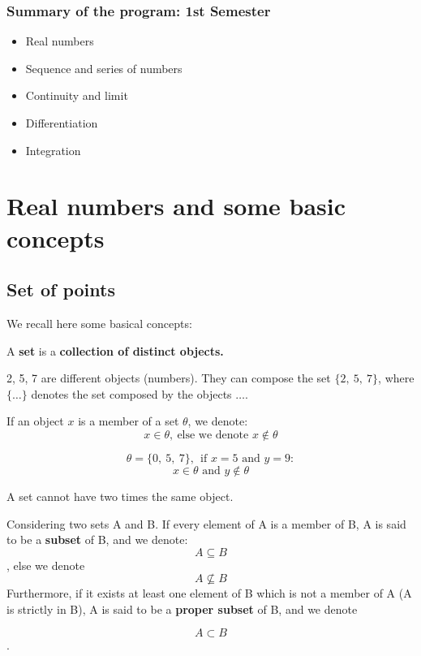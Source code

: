 \documentclass[12pt, a4paper]{book}
\begin{document}
\subsection*{Summary of the program: 1st Semester}
\begin{itemize}
  \item Real numbers
  \item Sequence and series of numbers
  \item Continuity and limit
  \item Differentiation
  \item Integration
\end{itemize}

\chapter{Real numbers and some basic concepts}

\section{Set of points}
We recall here some basical concepts:
\begin{defn}
  A \textbf{set} is a \textbf{collection of distinct objects.}
\end{defn}
\begin{exmp}
  2, 5, 7 are different objects (numbers). They can compose the set $\{2, \ 5, \ 7 \}$, where $\{ \ldots \}$ denotes the
  set composed by the objects $\ldots$.
\end{exmp}

\begin{note}
  If an object $x$ is a member of a set $\theta$, we denote: 
  $$ x \in \theta, \ \text{else we denote } x \notin \theta$$

  \begin{exmp}
    \[
      \theta = \{0, \ 5, \ 7 \}, \ \ \text{if }x=5 \text{ and } y=9:
    \]
    \[
      x \in \theta \text{ and } y \notin \theta
    \]
  \end{exmp}
\end{note}

\begin{rem}
  A set cannot have two times the same object.
\end{rem}

\begin{defn}
  Considering two sets A and B. If every element of A is a member of B, A is said to be a \textbf{subset} of B, and we denote:
  \boldmath $$ A \subseteq B$$, else we denote 
  $$ A \nsubseteq B $$ 
  Furthermore, if it exists at least one element of B which is not a member of A (A is strictly in B), A is said to be a \textbf{proper subset} of B, and we denote

  $$ A \subset B $$. \unboldmath
  
\end{defn}
\end{document}
